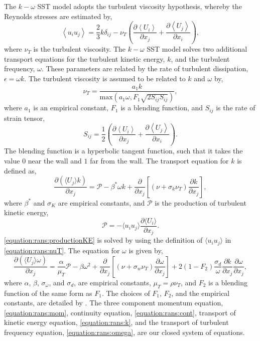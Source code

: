 \documentclass[12pt,oneside,a4paper]{article}
\newcommand{\pdev}[2]{\frac{\partial {#1}}{\partial {#2}}}
\begin{document}
The $k-\omega$ SST model adopts the turbulent viscosity hypothesis, whereby the Reynolds stresses are estimated by,
%
\begin{equation}
 \left< u_i u_j \right> =  \frac{2}{3}k \delta_{ij} - \nu_T \left(
	\pdev{\left< U_i \right>}{x_j} + \pdev{\left< U_j \right>}{x_i}	\right),
\end{equation}
%
where $\nu_T$ is the turbulent viscosity. The $k-\omega$ SST model solves two additional transport equations for the turbulent kinetic energy, $k$, and the turbulent frequency, $\omega$. These parameters are related by the rate of turbulent dissipation, $\epsilon = \omega k$. The turbulent viscosity is assumed to be related to $k$ and $\omega$ by,
%
\begin{equation}
\label{equation:rans:nuT}
\nu_T = \frac{a_1 k}{\text{max}\left( a_1 \omega , F_1 \sqrt{2S_{ij} S_{ij}}\right)},
\end{equation}
%
where $a_1$ is an empirical constant, $F_1$ is a blending function, and $S_{ij}$ is the rate of strain tensor,
%
\begin{equation}
S_{ij} = \frac{1}{2}\left( \pdev{\left< U_i \right>}{x_j} + \pdev{\left< U_j \right>}{x_i} \right).
\end{equation}
%
The blending function is a hyperbolic tangent function, such that it takes the value $0$ near the wall and $1$ far from the wall. The transport equation for $k$ is defined as,
%
\begin{equation}
\label{equation:rans:k}
\pdev{(\langle U_j \rangle k)}{x_j} = \mathcal{P} -\beta^* \omega k + \pdev{}{x_j}\left[ 		\left(		\nu + \sigma_k \nu_T	\right) \pdev{k}{x_j}		 \right],
\end{equation}
%
where $\beta^*$ and $\sigma_K$ are empirical constants, and $\mathcal{P}$ is the production of turbulent kinetic energy,
%
\begin{equation}
\label{equation:rans:productionKE}
\mathcal{P} = -\langle u_i u_j \rangle \pdev{\langle U_i \rangle}{x_j}.
\end{equation}
%
\eqref{equation:rans:productionKE} is solved by using the definition of $\langle u_i u_j \rangle $ in \eqref{equation:rans:nuT}. The equation for $\omega$ is given by,
%
\begin{equation}
\label{equation:rans:omega}
\pdev{(\langle U_j \rangle \omega)}{x_j} = \frac{\alpha}{\mu_T} \mathcal{P} -\beta \omega^2 + \pdev{}{x_j}\left[ 		\left(		\nu + \sigma_w \nu_T	\right) \pdev{\omega}{x_j}		 \right] + 2(1-F_2) \frac{\sigma_d}{\omega} \pdev{k}{x_j}\pdev{\omega}{x_j},
\end{equation}
%
where $\alpha$, $\beta$, $\sigma_\omega$, and $\sigma_d$, are empirical constants, $\mu_T =  \rho \nu_T$, and $F_2$ is a blending function of the same form as $F_1$. The choices of $F_1$, $F_2$, and the empirical constants, are detailed by \cite{menter1994}. The three component momentum equation, \eqref{equation:rans:mom}, continuity equation, \eqref{equation:rans:cont}, transport of kinetic energy equation, \eqref{equation:rans:k}, and the transport of turbulent frequency equation, \eqref{equation:rans:omega}, are our closed system of equations. 
\end{document}
